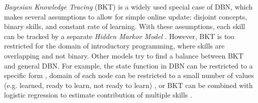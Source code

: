 \emph{Bayesian Knowledge Tracing} (BKT) \cite{bkt} %
is a widely used special case of DBN, which makes several assumptions to allow
for simple online update: %
disjoint concepts, binary skills, and constant rate of learning.
With these assumptions, each skill can be tracked by a separate
\emph{Hidden Markov Model} \cite{hmm}.
However, BKT is too restricted for the domain of introductory programming,
where skills are
overlapping and not binary. Other models try to find a balance
between BKT and general DBN.
For example, the state function in DBN can be restricted to a specific form
\cite[section 5.1.2]{student-models-review-2012},
domain of each node can be restricted to a small number of values
(e.g. learned, ready to learn, not ready to learn) \cite{its-programming},
or BKT can be combined with logistic regression to estimate contribution
of multiple skills \cite{bn-logreg}.


